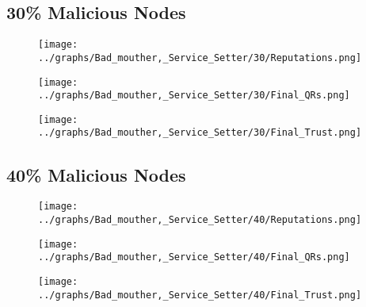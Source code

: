 \documentclass{article}
\begin{document}
  \begin{minipage}[t]{0.49\columnwidth}
    \subsection*{30\% Malicious Nodes}
        \begin{figure}[H]
            \centering
            \texttt{[image: ../graphs/Bad\_mouther,\_Service\_Setter/30/Reputations.png]}
        \end{figure}
        \begin{figure}[H]
            \centering
            \texttt{[image: ../graphs/Bad\_mouther,\_Service\_Setter/30/Final\_QRs.png]}
        \end{figure}
    \end{minipage}
    \begin{minipage}[t]{0.49\columnwidth}
        \begin{figure}[H]
            \centering
            \texttt{[image: ../graphs/Bad\_mouther,\_Service\_Setter/30/Final\_Trust.png]}
        \end{figure}
    \end{minipage}

  \begin{minipage}[t]{0.49\columnwidth}
    \subsection*{40\% Malicious Nodes}
        \begin{figure}[H]
            \centering
            \texttt{[image: ../graphs/Bad\_mouther,\_Service\_Setter/40/Reputations.png]}
        \end{figure}
        \begin{figure}[H]
            \centering
            \texttt{[image: ../graphs/Bad\_mouther,\_Service\_Setter/40/Final\_QRs.png]}
        \end{figure}
    \end{minipage}
    \begin{minipage}[t]{0.49\columnwidth}
        \begin{figure}[H]
            \centering
            \texttt{[image: ../graphs/Bad\_mouther,\_Service\_Setter/40/Final\_Trust.png]}
        \end{figure}
    \end{minipage}
\end{document}
